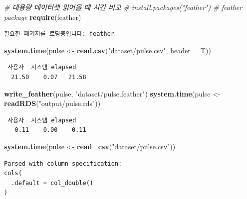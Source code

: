 \documentclass[
  11pt,
]{krantz}
\newenvironment{Shaded}{\begin{snugshade}}{\end{snugshade}}
\newcommand{\CommentTok}[1]{\textcolor[rgb]{0.37,0.37,0.37}{\textit{#1}}}
\newcommand{\DataTypeTok}[1]{\textcolor[rgb]{0.27,0.27,0.27}{#1}}
\newcommand{\KeywordTok}[1]{\textcolor[rgb]{0.27,0.27,0.27}{\textbf{#1}}}
\newcommand{\NormalTok}[1]{#1}
\newcommand{\StringTok}[1]{\textcolor[rgb]{0.5,0.5,0.5}{#1}}
\begin{document}
\begin{Shaded}
\begin{Highlighting}[]
\CommentTok{# 대용량 데이터셋 읽어올 때 시간 비교}
\CommentTok{# install.packages("feather") # feather package}
\KeywordTok{require}\NormalTok{(feather)}
\end{Highlighting}
\end{Shaded}

\begin{verbatim}
필요한 패키지를 로딩중입니다: feather
\end{verbatim}

\begin{Shaded}
\begin{Highlighting}[]
\KeywordTok{system.time}\NormalTok{(pulse <-}\StringTok{ }\KeywordTok{read.csv}\NormalTok{(}\StringTok{"dataset/pulse.csv"}\NormalTok{, }\DataTypeTok{header =}\NormalTok{ T))}
\end{Highlighting}
\end{Shaded}

\begin{verbatim}
 사용자  시스템 elapsed 
  21.50    0.07   21.58 
\end{verbatim}

\begin{Shaded}
\begin{Highlighting}[]
\KeywordTok{write_feather}\NormalTok{(pulse, }\StringTok{"dataset/pulse.feather"}\NormalTok{)}
\KeywordTok{system.time}\NormalTok{(pulse <-}\StringTok{ }\KeywordTok{readRDS}\NormalTok{(}\StringTok{"output/pulse.rds"}\NormalTok{))}
\end{Highlighting}
\end{Shaded}

\begin{verbatim}
 사용자  시스템 elapsed 
   0.11    0.00    0.11 
\end{verbatim}

\begin{Shaded}
\begin{Highlighting}[]
\KeywordTok{system.time}\NormalTok{(pulse <-}\StringTok{ }\KeywordTok{read_csv}\NormalTok{(}\StringTok{"dataset/pulse.csv"}\NormalTok{))}
\end{Highlighting}
\end{Shaded}

\begin{verbatim}
Parsed with column specification:
cols(
  .default = col_double()
)
\end{verbatim}
\end{document}
